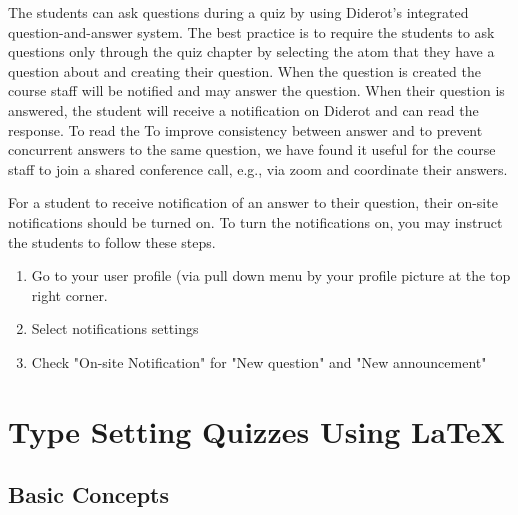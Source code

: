 \begin{cluster}
\label{grp:grm:quiz::questions}

\begin{gram}
\label{grm:quiz::questions}
The students can ask questions during a quiz by using Diderot's
integrated question-and-answer system.
The best practice is to require the students to ask questions only
through the quiz chapter by selecting the atom that they have a
question about and creating their question.
When the question is created the course staff will be notified and may answer the question. 
When their question is answered, the student will receive a notification on Diderot and can read the response.
To read the 
To improve consistency between answer and to prevent concurrent answers to the same question, we have found it useful for the course staff to join a shared conference call, e.g., via zoom and coordinate their answers. 

\end{gram}
\end{cluster}

\begin{cluster}
\label{grp:grm:quiz::on-site-notifications}

\begin{gram}
\label{grm:quiz::on-site-notifications}
For a student to receive notification of an answer to their question,
their on-site notifications should be turned on.  
To turn the notifications on, you may instruct the students to follow
these steps.
\begin{enumerate}
\item  Go to your user profile (via pull down menu by your profile picture at the top right corner. 

\item Select notifications settings

\item Check "On-site Notification" for "New question" and "New announcement"
\end{enumerate}

\end{gram}
\end{cluster}


\section{Type Setting Quizzes Using LaTeX}
\label{ch:quiz::typesetting}


\subsection{Basic Concepts}
\label{sec:quiz::basic-concepts}

